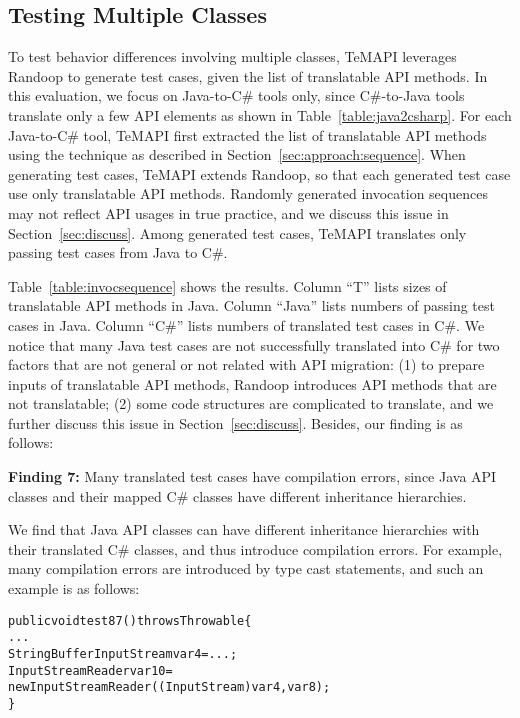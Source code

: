 \subsection{Testing Multiple Classes}
\label{sec:evaluation:sequence}

To test behavior differences involving multiple classes, TeMAPI leverages Randoop to generate test cases, given the list of translatable API methods. In this evaluation, we focus on Java-to-C\# tools only, since C\#-to-Java tools translate only a few API elements as shown in Table~\ref{table:java2csharp}. For each Java-to-C\# tool, TeMAPI first extracted the list of translatable API methods using the technique as described in Section~\ref{sec:approach:sequence}. When generating test cases, TeMAPI extends Randoop, so that each generated test case use only translatable API methods. Randomly generated invocation sequences may not reflect API usages in true practice, and we discuss this issue in Section~\ref{sec:discuss}. Among generated test cases, TeMAPI translates only passing test cases from Java to C\#.

Table~\ref{table:invocsequence} shows the results. Column ``T'' lists sizes of translatable API methods in Java. Column ``Java'' lists numbers of passing test cases in Java. Column ``C\#'' lists numbers of translated test cases in C\#. We notice that many Java test cases are not successfully translated into C\# for two factors that are not general or not related with API migration: (1) to prepare inputs of translatable API methods, Randoop introduces API methods that are not translatable; (2) some code structures are complicated to translate, and we further discuss this issue in Section~\ref{sec:discuss}. Besides, our finding is as follows:

\textbf{Finding 7:} Many translated test cases have compilation errors, since Java API classes and their mapped C\# classes have different inheritance hierarchies.

We find that Java API classes can have different inheritance hierarchies with their translated C\# classes, and thus introduce compilation errors. For example, many compilation errors are introduced by type cast statements, and such an example is as follows:

\begin{CodeOut}\vspace*{-1ex}
\begin{alltt}
public void test87() throws Throwable\{
  ...
  StringBufferInputStream var4=...;
  InputStreamReader var10=
    new InputStreamReader((InputStream)var4, var8);
\}
\end{alltt}
\end{CodeOut}\vspace*{-2ex}

